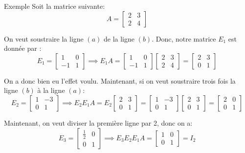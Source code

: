\documentclass[a4paper]{article}
\begin{document}
\begin{parag}{Exemple}
    Soit la matrice suivante:
    \[A = \begin{bmatrix} 2 & 3 \\ 2 & 4 \end{bmatrix} \]

    On veut soustraire la ligne $\left(a\right)$ de la ligne $\left(b\right)$. Donc, notre matrice $E_1$ est donnée par :
    \[E_1 = \begin{bmatrix} 1 & 0 \\ -1 & 1 \end{bmatrix} \implies E_1 A = \begin{bmatrix} 1 & 0 \\ -1 & 1 \end{bmatrix} \begin{bmatrix} 2 & 3 \\ 2 & 4 \end{bmatrix} = \begin{bmatrix} 2 & 3 \\ 0 & 1 \end{bmatrix} \]

    On a donc bien eu l'effet voulu. Maintenant, si on veut soustraire trois fois la ligne $\left(b\right)$ à la ligne $\left(a\right)$:
    \[E_2 = \begin{bmatrix} 1 & -3 \\ 0 & 1 \end{bmatrix} \implies E_2 E_1 A = E_2 \begin{bmatrix} 2 & 3 \\ 0 & 1 \end{bmatrix}  = \begin{bmatrix} 1 & -3 \\ 0 & 1 \end{bmatrix} \begin{bmatrix} 2 & 3 \\ 0 & 1 \end{bmatrix} = \begin{bmatrix} 2 & 0 \\ 0 & 1 \end{bmatrix} \]

    Maintenant, on veut diviser la première ligne par 2, donc on a:
    \[E_3 = \begin{bmatrix} \frac{1}{2} & 0 \\ 0 & 1 \end{bmatrix} \implies E_3 E_2 E_1 A = \begin{bmatrix} 1 & 0 \\ 0 & 1 \end{bmatrix} = I_2\]


\end{parag}
\end{document}
